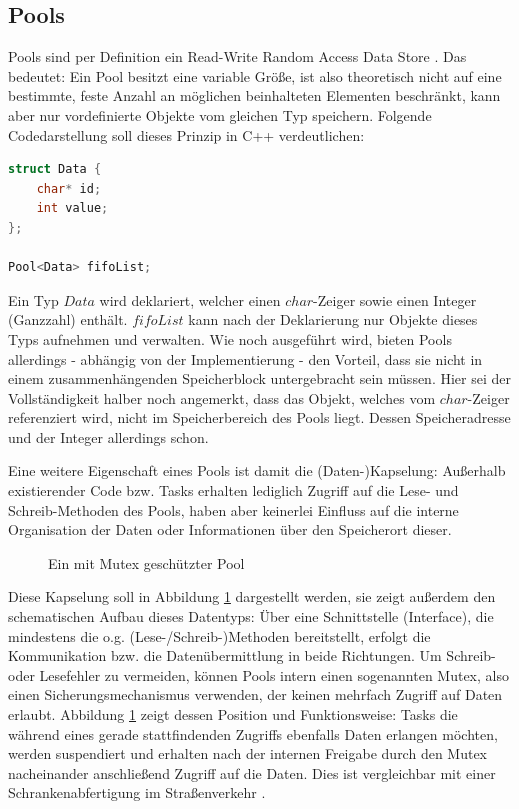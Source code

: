 \documentclass{llncs}
\begin{document}
\subsection{Pools}
\label{subsec:Pools}
Pools sind per Definition ein \glqq Read-Write Random Access Data Store\grqq{} \autocite[94]{Cooling2017}. Das bedeutet: Ein Pool besitzt eine variable Größe, ist also theoretisch nicht auf eine bestimmte, feste Anzahl an möglichen beinhalteten Elementen beschränkt, kann aber nur vordefinierte Objekte vom gleichen Typ speichern. Folgende Codedarstellung soll dieses Prinzip in C++ verdeutlichen:
\begin{lstlisting}[language=C++]
struct Data {
	char* id;
	int value;
};

Pool<Data> fifoList;
\end{lstlisting}
Ein Typ $Data$ wird deklariert, welcher einen $char$-Zeiger sowie einen Integer (Ganzzahl) enthält. $fifoList$ kann nach der Deklarierung nur Objekte dieses Typs aufnehmen und verwalten. Wie noch ausgeführt wird, bieten Pools allerdings - abhängig von der Implementierung - den Vorteil, dass sie nicht in einem zusammenhängenden Speicherblock untergebracht sein müssen. Hier sei der Vollständigkeit halber noch angemerkt, dass das Objekt, welches vom $char$-Zeiger referenziert wird, nicht im Speicherbereich des Pools liegt. Dessen Speicheradresse und der Integer allerdings schon.

Eine weitere Eigenschaft eines Pools ist damit die (Daten-)Kapselung: Außerhalb existierender Code bzw. Tasks erhalten lediglich Zugriff auf die Lese- und Schreib-Methoden des Pools, haben aber keinerlei Einfluss auf die interne Organisation der Daten oder Informationen über den Speicherort dieser.\\

\begin{figure}%
	\centering
	\def\svgwidth{.50\columnwidth}

	
	\caption{\label{fig:Pool}Ein mit Mutex geschützter Pool \autocite[vgl.][95]{Cooling2017}}
\end{figure}

Diese Kapselung soll in Abbildung \ref{fig:Pool} dargestellt werden, sie zeigt außerdem den schematischen Aufbau dieses Datentyps: Über eine Schnittstelle (Interface), die mindestens die o.g. (Lese-/Schreib-)Methoden bereitstellt, erfolgt die Kommunikation bzw. die Datenübermittlung in beide Richtungen. Um Schreib- oder Lesefehler zu vermeiden, können Pools intern einen sogenannten Mutex, also einen Sicherungsmechanismus verwenden, der keinen mehrfach Zugriff auf Daten erlaubt. Abbildung \ref{fig:Pool} zeigt dessen Position und Funktionsweise: Tasks die während eines gerade stattfindenden Zugriffs ebenfalls Daten erlangen möchten, werden suspendiert und erhalten nach der internen Freigabe durch den Mutex nacheinander anschließend Zugriff auf die Daten. Dies ist vergleichbar mit einer Schrankenabfertigung im Straßenverkehr \autocite[vgl.][95]{Cooling2017}.\\
\end{document}
